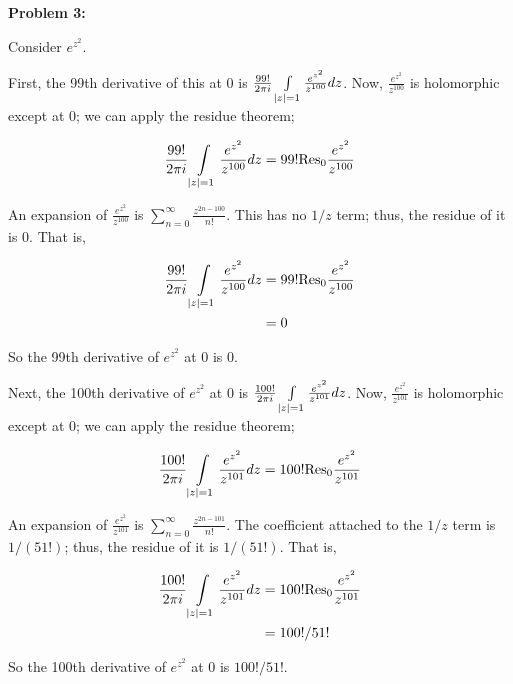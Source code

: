 \documentclass[a4paper,12pt]{article}
\begin{document}
\shunt

{\bf Problem 3:}

Consider $e^{z^2}$. 

First, the 99th derivative of this at $0$ is $\frac{99!}{2\pi i} \int\limits_{\left\lvert z \right\rvert = 1} \frac{e^{z^2}}{z^{100}} dz$. Now, $\frac{e^{z^2}}{z^{100}}$ is holomorphic except at $0$; we can apply the residue theorem;

\begin{align*}
\frac{99!}{2\pi i} \int\limits_{\left\lvert z \right\rvert = 1} \frac{e^{z^2}}{z^{100}} dz &= 99! \text{Res}_0 \frac{e^{z^2}}{z^{100}}\\
\end{align*}

An expansion of $\frac{e^{z^2}}{z^{100}}$ is $\sum\limits_{n=0}^\infty \frac{z^{2n-100}}{n!}$. This has no $1/z$ term; thus, the residue of it is $0$. That is,

\begin{align*}
\frac{99!}{2\pi i} \int\limits_{\left\lvert z \right\rvert = 1} \frac{e^{z^2}}{z^{100}} dz &= 99! \text{Res}_0 \frac{e^{z^2}}{z^{100}}\\
&= 0
\end{align*}

So the 99th derivative of $e^{z^2}$ at $0$ is $0$.

Next, the 100th derivative of $e^{z^2}$ at $0$ is $\frac{100!}{2\pi i} \int\limits_{\left\lvert z \right\rvert = 1} \frac{e^{z^2}}{z^{101}} dz$. Now, $\frac{e^{z^2}}{z^{101}}$ is holomorphic except at $0$; we can apply the residue theorem;

\begin{align*}
\frac{100!}{2\pi i} \int\limits_{\left\lvert z \right\rvert = 1} \frac{e^{z^2}}{z^{101}} dz &= 100! \text{Res}_0 \frac{e^{z^2}}{z^{101}}\\
\end{align*}

An expansion of $\frac{e^{z^2}}{z^{101}}$ is $\sum\limits_{n=0}^\infty \frac{z^{2n-101}}{n!}$. The coefficient attached to the $1/z$ term is $1/(51!)$; thus, the residue of it is $1/(51!)$. That is,

\begin{align*}
\frac{100!}{2\pi i} \int\limits_{\left\lvert z \right\rvert = 1} \frac{e^{z^2}}{z^{101}} dz &= 100! \text{Res}_0 \frac{e^{z^2}}{z^{101}}\\
&= 100!/51!
\end{align*}

So the 100th derivative of $e^{z^2}$ at $0$ is $100!/51!$.

\shunt
\end{document}

